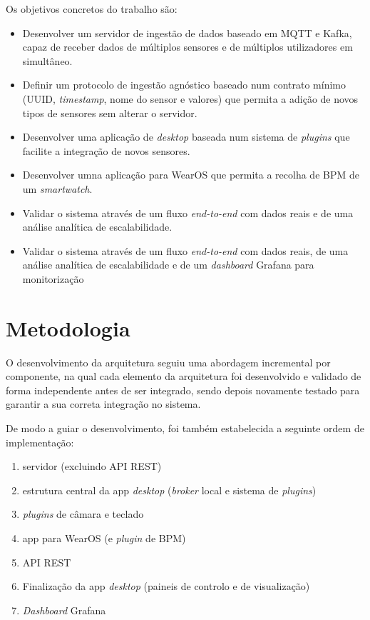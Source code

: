     Os objetivos concretos do trabalho são:
    \begin{itemize}
        \item Desenvolver um servidor de ingestão de dados baseado em \ac{MQTT} e Kafka, capaz de receber dados de múltiplos sensores e de múltiplos utilizadores em simultâneo.
        \item Definir um protocolo de ingestão agnóstico baseado num contrato mínimo (\ac{UUID}, \textit{timestamp}, nome do sensor e valores) que permita a adição de novos tipos de sensores sem alterar o servidor.
        \item Desenvolver uma aplicação de \textit{desktop} baseada num sistema de \textit{plugins} que facilite a integração de novos sensores.
        \item Desenvolver umna aplicação para WearOS que permita a recolha de \ac{BPM} de um \textit{smartwatch}.
        \item Validar o sistema através de um fluxo \textit{end-to-end} com dados reais e de uma análise analítica de escalabilidade.
        \item Validar o sistema através de um fluxo \textit{end-to-end} com dados reais, de uma análise analítica de escalabilidade e de um \textit{dashboard} Grafana para monitorização
    \end{itemize}

    
    \section{Metodologia}

    O desenvolvimento da arquitetura seguiu uma abordagem incremental por componente, na qual cada elemento da arquitetura foi desenvolvido e validado de forma independente antes de ser integrado, sendo depois novamente testado para garantir a sua correta integração no sistema.

    De modo a guiar o desenvolvimento, foi também estabelecida a seguinte ordem de implementação:
    \begin{enumerate}
        \item servidor (excluindo API REST)
        \item estrutura central da app \textit{desktop} (\textit{broker} local e sistema de \textit{plugins})
        \item \textit{plugins} de câmara e teclado
        \item app para WearOS (e \textit{plugin} de \ac{BPM})
        \item API REST
        \item Finalização da app \textit{desktop} (paineis de controlo e de visualização)
        \item \textit{Dashboard} Grafana
    \end{enumerate}

